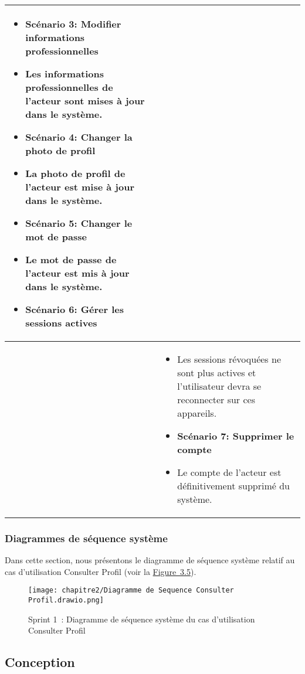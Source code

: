 \begin{longtable}{|>{\arraybackslash}p{4.2cm}|>{\arraybackslash}p{12.5cm}|}
\begin{itemize}[label=]
  \item\textbf{Scénario 3: Modifier informations professionnelles}
  \item Les informations professionnelles de l'acteur sont mises à jour dans le système.

  \item\textbf{Scénario 4: Changer la photo de profil}
  \item La photo de profil de l'acteur est mise à jour dans le système.

  \item\textbf{Scénario 5: Changer le mot de passe}
  \item Le mot de passe de l'acteur est mis à jour dans le système.
  \item\textbf{Scénario 6: Gérer les sessions actives}
\end{itemize} \\
\hline
\textbf{}&
\begin{itemize}[label=]

  \item Les sessions révoquées ne sont plus actives et l'utilisateur devra se reconnecter sur ces appareils.

  \item\textbf{Scénario 7: Supprimer le compte}
  \item Le compte de l'acteur est définitivement supprimé du système.
\end{itemize}\\
\hline
\end{longtable}


\subsubsection{Diagrammes de séquence système}

Dans cette section, nous présentons le diagramme de séquence système relatif au cas d'utilisation \og Consulter Profil \fg{} (voir la \hyperref[fig:3.5]{Figure~3.5}).
\begin{figure}[H]
    \centering
    \texttt{[image: chapitre2/Diagramme de Sequence Consulter Profil.drawio.png]}
    \caption{Sprint 1~: Diagramme de séquence système du cas d'utilisation \og Consulter Profil \fg{}}
    \label{fig:3.5}
\end{figure}

\subsection{Conception}

